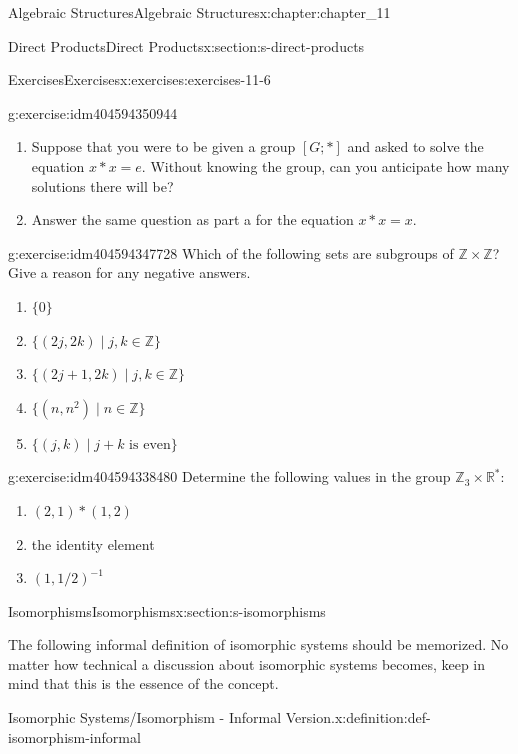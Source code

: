 \documentclass[twoside,10pt,]{book}
\numberwithin{equation}{section}
\begin{document}
\begin{chapterptx}{Algebraic Structures}{}{Algebraic Structures}{}{}{x:chapter:chapter_11}
\begin{sectionptx}{Direct Products}{}{Direct Products}{}{}{x:section:s-direct-products}
\begin{exercises-subsection}{Exercises}{}{Exercises}{}{}{x:exercises:exercises-11-6}
\begin{divisionexercise}{4}{}{}{g:exercise:idm404594350944}
\begin{enumerate}[label=(\alph*)]
\item{}Suppose that you were to be given a group \([G; * ]\) and asked to solve the equation \(x * x = e\). Without knowing the group, can you anticipate how many solutions there will be?%
\item{}Answer the same question as part a for the equation \(x * x = x\).%
\end{enumerate}
%
\end{divisionexercise}%
\begin{divisionexercise}{5}{}{}{g:exercise:idm404594347728}%
Which of the following sets are subgroups of \(\mathbb{Z} \times  \mathbb{Z}\)? Give a reason for any negative answers.%
\begin{enumerate}[label=(\alph*)]
\item{}\(\{0\}\)%
\item{}\(\{(2j, 2k) \mid j,k\in  \mathbb{Z}\}\)%
\item{}\(\{(2j+ 1, 2k) \mid j,k\in \mathbb{Z}\}\)%
\item{}\(\{(n, n^2 ) \mid n \in \mathbb{Z}\}\)%
\item{}\(\{(j, k) \mid j + k\textrm{ is} \textrm{ even}\}\)%
\end{enumerate}
%
\end{divisionexercise}%
\begin{divisionexercise}{6}{}{}{g:exercise:idm404594338480}%
Determine the following values in the group \(\mathbb{Z}_3 \times  \mathbb{R}^*\):%
\begin{enumerate}[label=(\alph*)]
\item{}\((2,1)* (1,2)\)%
\item{}the identity element%
\item{}\((1, 1/2)^{-1}\)%
\end{enumerate}
%
\end{divisionexercise}%
\end{exercises-subsection}
\end{sectionptx}
%
%
\typeout{************************************************}
\typeout{************************************************}
%
\begin{sectionptx}{Isomorphisms}{}{Isomorphisms}{}{}{x:section:s-isomorphisms}
%
\begin{introduction}{}%
The following informal definition of isomorphic systems should be memorized. No matter how technical a discussion about isomorphic systems becomes, keep in mind that this is the essence of the concept.%
\begin{definition}{Isomorphic Systems\slash{}Isomorphism - Informal Version.}{x:definition:def-isomorphism-informal}%

\end{definition}
\end{introduction}
\end{sectionptx}
\end{chapterptx}
\end{document}
